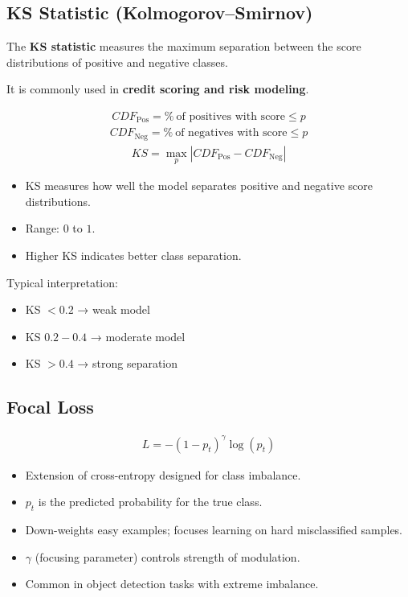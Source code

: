 \documentclass[10pt,a4paper]{article}
\begin{document}
	\subsection{KS Statistic (Kolmogorov--Smirnov)}

	The \textbf{KS statistic} measures the maximum separation between the score distributions of positive and negative classes.

	It is commonly used in \textbf{credit scoring and risk modeling}.

	\begin{align*}
		CDF_{\text{Pos}} = \%\ \text{of positives with score} \le p
	\end{align*}
	\begin{align*}
		CDF_{\text{Neg}} = \%\ \text{of negatives with score} \le p
	\end{align*}
	\begin{align*}
			KS = \max_p \left| CDF_{\text{Pos}} - CDF_{\text{Neg}} \right|
	\end{align*}


	\begin{itemize}
		\item KS measures how well the model separates positive and negative score distributions.
		\item Range: $0$ to $1$.
		\item Higher KS indicates better class separation.
	\end{itemize}

	Typical interpretation:

	\begin{itemize}
		\item KS $<0.2$ → weak model
		\item KS $0.2 - 0.4$ → moderate model
		\item KS $>0.4$ → strong separation
	\end{itemize}


	\subsection{Focal Loss}
		\begin{align*}
			L = - (1 - p_t)^\gamma \log(p_t)
		\end{align*}
	
		\begin{itemize}
			\item Extension of cross-entropy designed for class imbalance.
			\item $p_t$ is the predicted probability for the true class.
			\item Down-weights easy examples; focuses learning on hard misclassified samples.
			\item $\gamma$ (focusing parameter) controls strength of modulation.
			\item Common in object detection tasks with extreme imbalance.
		\end{itemize}
\end{document}
